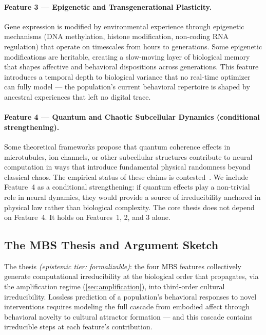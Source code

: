 \documentclass[11pt, a4paper]{article}
\theoremstyle{remark}
\begin{document}
\paragraph{Feature 3 --- Epigenetic and Transgenerational Plasticity.} Gene expression is modified by environmental experience through epigenetic mechanisms (DNA methylation, histone modification, non-coding RNA regulation) that operate on timescales from hours to generations. Some epigenetic modifications are heritable, creating a slow-moving layer of biological memory that shapes affective and behavioral dispositions across generations. This feature introduces a temporal depth to biological variance that no real-time optimizer can fully model --- the population's current behavioral repertoire is shaped by ancestral experiences that left no digital trace.

\paragraph{Feature 4 --- Quantum and Chaotic Subcellular Dynamics (conditional strengthening).} Some theoretical frameworks propose that quantum coherence effects in microtubules, ion channels, or other subcellular structures contribute to neural computation in ways that introduce fundamental physical randomness beyond classical chaos. The empirical status of these claims is contested~\cite{preskill2018}. We include Feature~4 as a conditional strengthening: if quantum effects play a non-trivial role in neural dynamics, they would provide a source of irreducibility anchored in physical law rather than biological complexity. The core thesis does not depend on Feature~4. It holds on Features~1, 2, and 3 alone.

\subsection{The MBS Thesis and Argument Sketch}\label{sec:mbs-thesis}

The thesis \textit{(epistemic tier: formalizable)}: the four MBS features collectively generate computational irreducibility at the biological order that propagates, via the amplification regime (\cref{sec:amplification}), into third-order cultural irreducibility. Lossless prediction of a population's behavioral responses to novel interventions requires modeling the full cascade from embodied affect through behavioral novelty to cultural attractor formation --- and this cascade contains irreducible steps at each feature's contribution.
\end{document}
